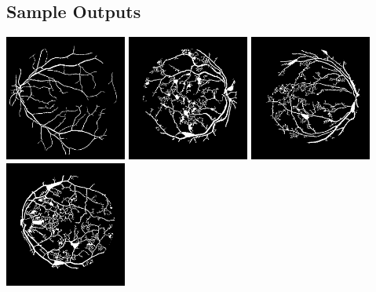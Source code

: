 \documentclass{article}
\begin{document}
\subsection{Sample Outputs}
\includegraphics[width=0.3\textwidth]{results/final_21.jpg}
\includegraphics[width=0.3\textwidth]{results/final_25.jpg}
\includegraphics[width=0.3\textwidth]{results/final_30.jpg}
\includegraphics[width=0.3\textwidth]{results/final_35.jpg}
\end{document}
